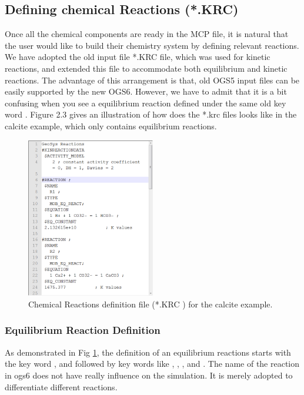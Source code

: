 \subsection{Defining chemical Reactions (*.KRC)}

Once all the chemical components are ready in the MCP file, it is natural that the user would like to build their chemistry system by defining relevant reactions. We have adopted the old input file *.KRC file, which was used for kinetic reactions, and extended this file to accommodate both equilibrium and kinetic reactions. The advantage of this arrangement is that, old OGS5 input files can be easily supported by the new OGS6. However, we have to admit that it is a bit confusing when you see a equilibrium reaction defined under the same old key word . Figure 2.3 gives an illustration of how does the *.krc files looks like in the calcite example, which only contains equilibrium reactions. 

\begin{figure}
\includegraphics[width=0.5\textwidth]{RT/figs/RT_fig_krc_file}
\caption{Chemical Reactions definition file (*.KRC ) for the calcite example. }
\label{fig:RT_krc_file}
\end{figure}

\subsubsection{Equilibrium Reaction Definition}

As demonstrated in Fig \ref{fig:RT_krc_file}, the definition of an equilibrium reactions starts with the key word , and followed by key words like , , , and .  The name of the reaction in ogs6 does not have really influence on the simulation. It is merely adopted to differentiate different reactions. 

